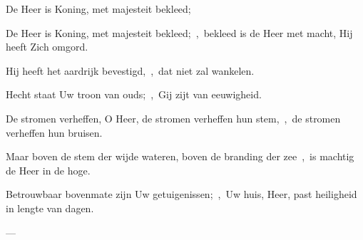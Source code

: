 \documentclass[12pt,twoside,a5paper]{article}
\begin{document}
\begin{halfparskip}
   De Heer is Koning, met majesteit bekleed;


  De Heer is Koning, met majesteit bekleed;~\sep\ bekleed is de Heer met macht, Hij heeft Zich omgord.

  Hij heeft het aardrijk bevestigd,~\sep\ dat niet zal wankelen.

  Hecht staat Uw troon van ouds;~\sep\ Gij zijt van eeuwigheid.

  De stromen verheffen, O Heer, de stromen verheffen hun stem,~\sep\ de stromen verheffen hun bruisen.

  Maar boven de stem der wijde wateren, boven de branding der zee~\sep\ is machtig de Heer in de hoge.

  Betrouwbaar bovenmate zijn Uw getuigenissen;~\sep\ Uw huis, Heer, past heiligheid in lengte van dagen.

   --- 
\end{halfparskip}
\end{document}
